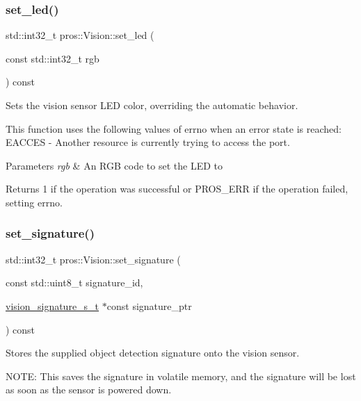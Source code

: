 \subsubsection{\texorpdfstring{set\_led()}{set\_led()}}
{\footnotesize\ttfamily std\+::int32\+\_\+t pros\+::\+Vision\+::set\+\_\+led (\begin{DoxyParamCaption}\item[{const std\+::int32\+\_\+t}]{rgb }\end{DoxyParamCaption}) const}



Sets the vision sensor L\+ED color, overriding the automatic behavior. 

This function uses the following values of errno when an error state is reached\+: E\+A\+C\+C\+ES -\/ Another resource is currently trying to access the port.


\begin{DoxyParams}{Parameters}
{\em rgb} & An R\+GB code to set the L\+ED to\\
\hline
\end{DoxyParams}
\begin{DoxyReturn}{Returns}
1 if the operation was successful or P\+R\+O\+S\+\_\+\+E\+RR if the operation failed, setting errno. 
\end{DoxyReturn}
\mbox{\label{classpros_1_1Vision_a71c3c083ad5538a544e377ebc510cb75}} 
\subsubsection{\texorpdfstring{set\_signature()}{set\_signature()}}
{\footnotesize\ttfamily std\+::int32\+\_\+t pros\+::\+Vision\+::set\+\_\+signature (\begin{DoxyParamCaption}\item[{const std\+::uint8\+\_\+t}]{signature\+\_\+id,  }\item[{\mbox{\hyperlink{vision_8h_a135c729c7277f6cc019c2924088a5fd5}{vision\+\_\+signature\+\_\+s\+\_\+t}} $\ast$const}]{signature\+\_\+ptr }\end{DoxyParamCaption}) const}



Stores the supplied object detection signature onto the vision sensor. 

N\+O\+TE\+: This saves the signature in volatile memory, and the signature will be lost as soon as the sensor is powered down.


